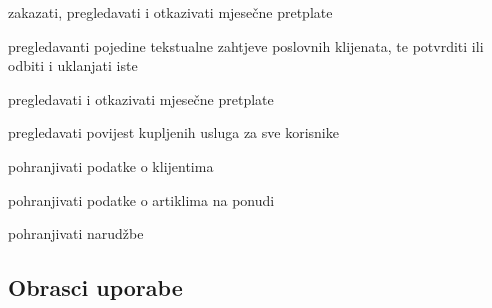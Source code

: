 \begin{packed_enum}
\begin{packed_enum}
					\item zakazati, pregledavati i otkazivati mjesečne pretplate
					
				\end{packed_enum}
			
				\item  {}
				
				\begin{packed_enum}
					
					\item pregledavanti pojedine tekstualne zahtjeve poslovnih klijenata, te potvrditi ili odbiti i uklanjati iste
					
					\item pregledavati i otkazivati mjesečne pretplate
					
					\item pregledavati povijest kupljenih usluga za  sve  korisnike
					
				\end{packed_enum}
				
				\item  {}
				
				\begin{packed_enum}
					
					\item pohranjivati podatke o klijentima
					\item pohranjivati podatke o artiklima na ponudi
					\item pohranjivati narudžbe
					
				\end{packed_enum}
			\end{packed_enum}
			
			\eject 
			
			
				
			\subsection{Obrasci uporabe}
				
				
					

